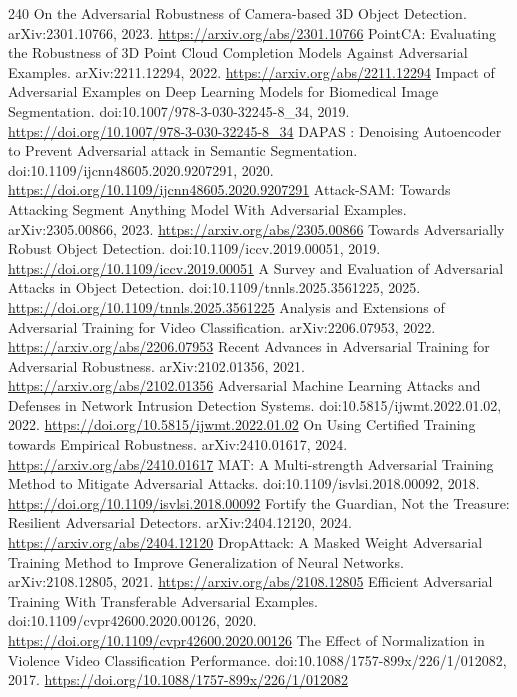 \documentclass[11pt]{article}
\begin{document}
\begin{thebibliography}{240}
 On the Adversarial Robustness of Camera-based 3D Object Detection. arXiv:2301.10766, 2023. \url{https://arxiv.org/abs/2301.10766}
 PointCA: Evaluating the Robustness of 3D Point Cloud Completion Models Against Adversarial Examples. arXiv:2211.12294, 2022. \url{https://arxiv.org/abs/2211.12294}
 Impact of Adversarial Examples on Deep Learning Models for Biomedical Image Segmentation. doi:10.1007/978-3-030-32245-8\_34, 2019. \url{https://doi.org/10.1007/978-3-030-32245-8_34}
 DAPAS : Denoising Autoencoder to Prevent Adversarial attack in Semantic Segmentation. doi:10.1109/ijcnn48605.2020.9207291, 2020. \url{https://doi.org/10.1109/ijcnn48605.2020.9207291}
 Attack-SAM: Towards Attacking Segment Anything Model With Adversarial Examples. arXiv:2305.00866, 2023. \url{https://arxiv.org/abs/2305.00866}
 Towards Adversarially Robust Object Detection. doi:10.1109/iccv.2019.00051, 2019. \url{https://doi.org/10.1109/iccv.2019.00051}
 A Survey and Evaluation of Adversarial Attacks in Object Detection. doi:10.1109/tnnls.2025.3561225, 2025. \url{https://doi.org/10.1109/tnnls.2025.3561225}
 Analysis and Extensions of Adversarial Training for Video Classification. arXiv:2206.07953, 2022. \url{https://arxiv.org/abs/2206.07953}
 Recent Advances in Adversarial Training for Adversarial Robustness. arXiv:2102.01356, 2021. \url{https://arxiv.org/abs/2102.01356}
 Adversarial Machine Learning Attacks and Defenses in Network Intrusion Detection Systems. doi:10.5815/ijwmt.2022.01.02, 2022. \url{https://doi.org/10.5815/ijwmt.2022.01.02}
 On Using Certified Training towards Empirical Robustness. arXiv:2410.01617, 2024. \url{https://arxiv.org/abs/2410.01617}
 MAT: A Multi-strength Adversarial Training Method to Mitigate Adversarial Attacks. doi:10.1109/isvlsi.2018.00092, 2018. \url{https://doi.org/10.1109/isvlsi.2018.00092}
 Fortify the Guardian, Not the Treasure: Resilient Adversarial Detectors. arXiv:2404.12120, 2024. \url{https://arxiv.org/abs/2404.12120}
 DropAttack: A Masked Weight Adversarial Training Method to Improve Generalization of Neural Networks. arXiv:2108.12805, 2021. \url{https://arxiv.org/abs/2108.12805}
 Efficient Adversarial Training With Transferable Adversarial Examples. doi:10.1109/cvpr42600.2020.00126, 2020. \url{https://doi.org/10.1109/cvpr42600.2020.00126}
 The Effect of Normalization in Violence Video Classification Performance. doi:10.1088/1757-899x/226/1/012082, 2017. \url{https://doi.org/10.1088/1757-899x/226/1/012082}

\end{thebibliography}
\end{document}
